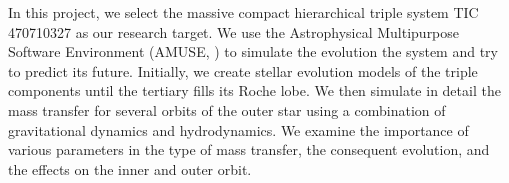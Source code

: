 In this project, we select the massive compact hierarchical triple system TIC 470710327 as our research target. We use  the Astrophysical Multipurpose Software Environment (AMUSE, \cite{portegies2018astrophysical}) to simulate the evolution the system and try to predict its future. Initially, we create stellar evolution models of the triple components until the tertiary fills its Roche lobe. We then simulate in detail the  mass transfer for several orbits of the outer star using a combination of gravitational dynamics and hydrodynamics. We examine the importance of various parameters in the type of mass transfer, the consequent evolution, and the effects on the inner and outer orbit.





